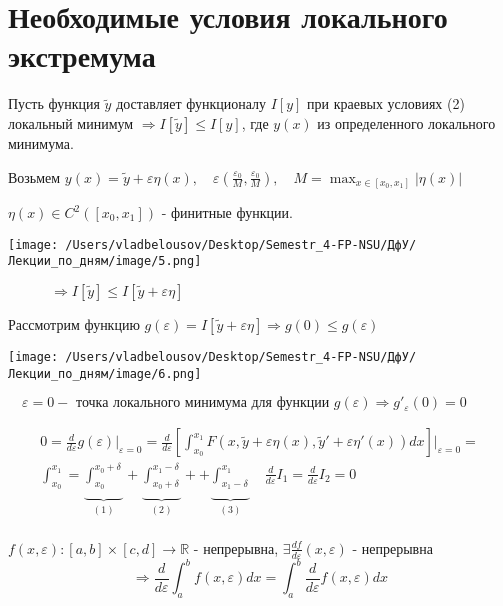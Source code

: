 \documentclass[12pt, a4paper]{report}
\begin{document}
\section{Необходимые условия локального экстремума}

Пусть функция \(\tilde{y}   \) доставляет функционалу \( I[y] \) при краевых условиях (2) локальный минимум \( \Rightarrow I[\tilde{y} ] \le I[y]  \), где \( y(x) \) из определенного локального минимума.

Возьмем \( \displaystyle y(x)=\tilde{y} + \varepsilon \eta(x) , \quad \varepsilon \left( \frac{\varepsilon_0}{M}, \frac{\varepsilon_0}{M}   \right), \quad  M= \max _{x \in  [x_0,x_1]} |\eta (x) |  \)

\( \eta (x) \in  C ^2 ([x_0,x_1])  \) - финитные функции. 

\begin{minipage}{0.4\textwidth}
    \texttt{[image: /Users/vladbelousov/Desktop/Semestr\_4-FP-NSU/ДфУ/Лекции\_по\_дням/image/5.png]}
\end{minipage}
\begin{minipage}{1\textwidth}
    \( \quad \quad \quad  \Rightarrow I[\tilde{y} ] \le I[\tilde{y} + \varepsilon \eta ]  \) 
\end{minipage}

Рассмотрим функцию \( g(\varepsilon)= I[\tilde{y}+ \varepsilon \eta  ] \Rightarrow g(0) \le g(\varepsilon) \) 

\begin{minipage}{0.25\textwidth}
    \texttt{[image: /Users/vladbelousov/Desktop/Semestr\_4-FP-NSU/ДфУ/Лекции\_по\_дням/image/6.png]}
\end{minipage}
\begin{minipage}{1\textwidth}
    \( \quad \varepsilon= 0 - \text{ точка локального минимума для функции } g(\varepsilon) \Rightarrow g'_{\varepsilon}(0)=0     \) 
\end{minipage}

\begin{gather*}
    0 = \frac{d}{d \varepsilon}g (\varepsilon) |_{\varepsilon=0}= \frac{d}{d \varepsilon} \left[ \int_{x_0}^{x_1} F(x,\tilde{y}+ \varepsilon\eta  (x) , \tilde{y}'+\varepsilon\eta ' (x) ) dx \right] \bigg |_{\varepsilon=0} \boxed{=}   \\
    \int_{x_0}^{x_1}= \underbrace{\int_{x_0}^{x_0+\delta} }_{(1)} +   \underbrace{\int_{x_0 +\delta}^{x_1-\delta} }_{(2)} + +\underbrace{\int_{x_1 -\delta}^{x_1} }_{(3)} \quad \frac{d}{d \varepsilon} I_1= \frac{d}{d \varepsilon} I_2=0 \\   
\end{gather*}
\begin{theorem}
    \( f(x, \varepsilon): [a,b] \times [c,d] \to \mathbb{R}  \) - непрерывна, \( \displaystyle \exists  \frac{df}{d \varepsilon} (x, \varepsilon)   \)  - непрерывна
    \[ \Rightarrow \frac{d}{d \varepsilon} \int_{a}^{b} f(x, \varepsilon)dx= \int_{a }^{b } \frac{d}{d \varepsilon } f(x, \varepsilon)dx     \]  
\end{theorem}  
\end{document}
